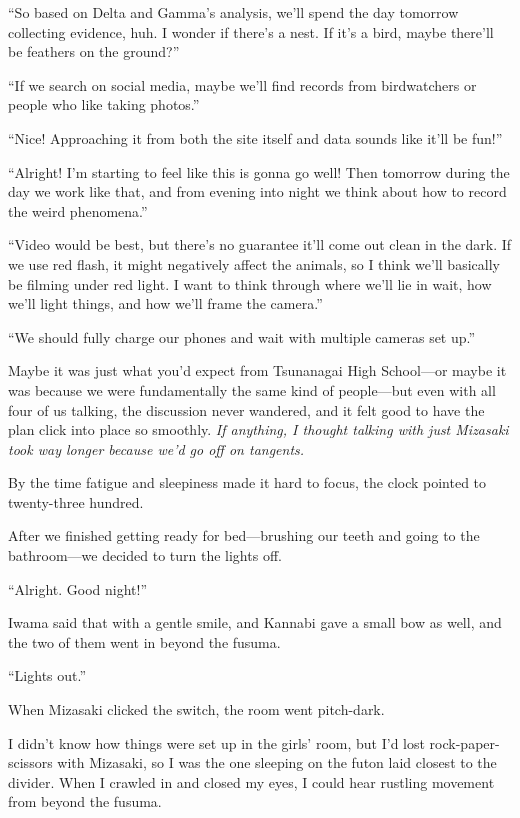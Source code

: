 \documentclass[
    a4paper,
    12pt,
    twoside,
    openany,
    UTF8,
    fontset=windows
]{ctexbook}
\begin{document}
``So based on Delta and Gamma's analysis, we'll spend the day tomorrow collecting evidence, huh. I wonder if there's a nest. If it's a bird, maybe there'll be feathers on the ground?''

``If we search on social media, maybe we'll find records from birdwatchers or people who like taking photos.''

``Nice! Approaching it from both the site itself and data sounds like it'll be fun!''

``Alright! I'm starting to feel like this is gonna go well! Then tomorrow during the day we work like that, and from evening into night we think about how to record the weird phenomena.''

``Video would be best, but there's no guarantee it'll come out clean in the dark. If we use red flash, it might negatively affect the animals, so I think we'll basically be filming under red light. I want to think through where we'll lie in wait, how we'll light things, and how we'll frame the camera.''

``We should fully charge our phones and wait with multiple cameras set up.''

Maybe it was just what you'd expect from Tsunanagai High School---or maybe it was because we were fundamentally the same kind of people---but even with all four of us talking, the discussion never wandered, and it felt good to have the plan click into place so smoothly. \textit{If anything, I thought talking with just Mizasaki took way longer because we'd go off on tangents.}

By the time fatigue and sleepiness made it hard to focus, the clock pointed to twenty-three hundred.

After we finished getting ready for bed---brushing our teeth and going to the bathroom---we decided to turn the lights off.

``Alright. Good night!''

Iwama said that with a gentle smile, and Kannabi gave a small bow as well, and the two of them went in beyond the fusuma.

``Lights out.''

When Mizasaki clicked the switch, the room went pitch-dark.

I didn't know how things were set up in the girls' room, but I'd lost rock-paper-scissors with Mizasaki, so I was the one sleeping on the futon laid closest to the divider. When I crawled in and closed my eyes, I could hear rustling movement from beyond the fusuma.
\end{document}
